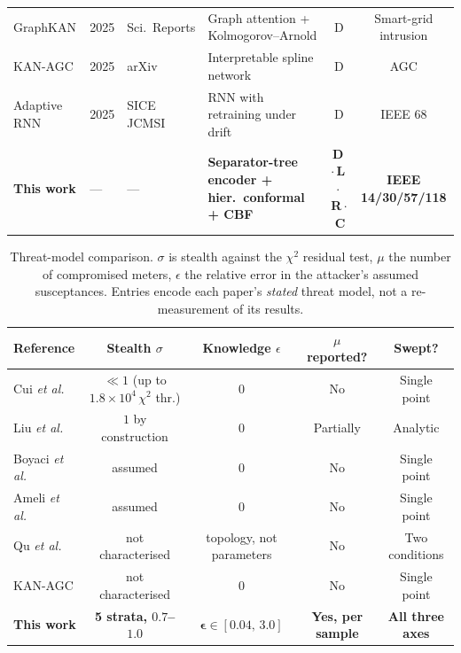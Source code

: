 \begin{table}[!t]
\begin{tabular}{@{}llllcc@{}}
GraphKAN \cite{graphkan2025} & 2025 & Sci.\ Reports
  & Graph attention + Kolmogorov--Arnold & D & Smart-grid intrusion \\
KAN-AGC \cite{kanagc2025} & 2025 & arXiv
  & Interpretable spline network & D & AGC \\
Adaptive RNN \cite{adaptrnn2025} & 2025 & SICE JCMSI
  & RNN with retraining under drift & D & IEEE 68 \\
\midrule
\textbf{This work} & --- & ---
  & \textbf{Separator-tree encoder + hier.\ conformal + CBF}
  & \textbf{D\,$\cdot$\,L\,$\cdot$\,R\,$\cdot$\,C} & \textbf{IEEE 14/30/57/118} \\
\bottomrule
\end{tabular}
\end{table}


\begin{table}[!t]
\caption{Threat-model comparison. $\sigma$ is stealth against the $\chi^2$
residual test, $\mu$ the number of compromised meters, $\epsilon$ the relative
error in the attacker's assumed susceptances. Entries encode each paper's
\emph{stated} threat model, not a re-measurement of its results.}
\label{tab:threat}
\centering
\begin{tabular}{@{}lcccc@{}}
\toprule
Reference & Stealth $\sigma$ & Knowledge $\epsilon$ & $\mu$ reported? & Swept? \\
\midrule
Cui \textit{et al.} \cite{cui2025} & $\ll 1$ (up to $1.8\times10^{4}\,\chi^2$ thr.)
  & $0$ & No & Single point \\
Liu \textit{et al.} \cite{liu2011} & $1$ by construction & $0$
  & Partially & Analytic \\
Boyaci \textit{et al.} \cite{boyaci2022} & assumed & $0$ & No & Single point \\
Ameli \textit{et al.} \cite{ameli2018} & assumed & $0$ & No & Single point \\
Qu \textit{et al.} \cite{qu2024} & not characterised & topology, not parameters
  & No & Two conditions \\
KAN-AGC \cite{kanagc2025} & not characterised & $0$ & No & Single point \\
\midrule
\textbf{This work} & \textbf{5 strata, $0.7$--$1.0$}
  & $\boldsymbol{\epsilon\in[0.04,\,3.0]}$ & \textbf{Yes, per sample}
  & \textbf{All three axes} \\
\bottomrule
\end{tabular}
\end{table}


